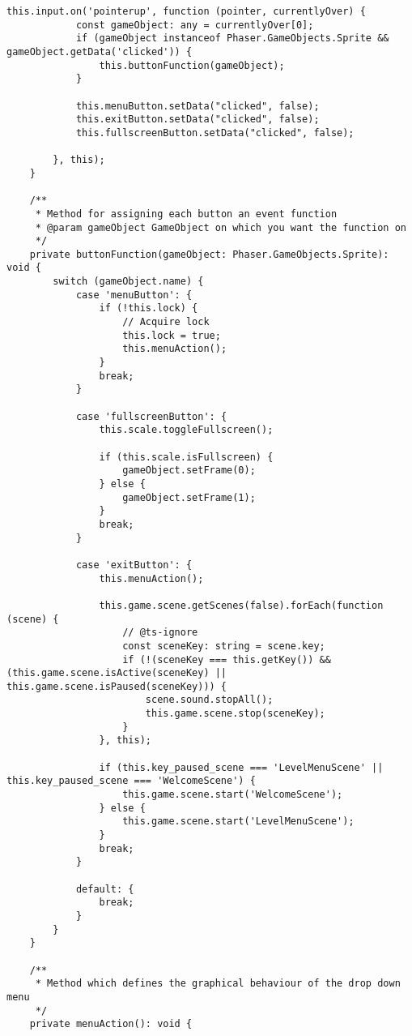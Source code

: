 \begin{lstlisting}[style=TypeScript, caption={dropDownMenu.ts}]
        this.input.on('pointerup', function (pointer, currentlyOver) {
            const gameObject: any = currentlyOver[0];
            if (gameObject instanceof Phaser.GameObjects.Sprite && gameObject.getData('clicked')) {
                this.buttonFunction(gameObject);
            }

            this.menuButton.setData("clicked", false);
            this.exitButton.setData("clicked", false);
            this.fullscreenButton.setData("clicked", false);

        }, this);
    }

    /**
     * Method for assigning each button an event function
     * @param gameObject GameObject on which you want the function on
     */
    private buttonFunction(gameObject: Phaser.GameObjects.Sprite): void {
        switch (gameObject.name) {
            case 'menuButton': {
                if (!this.lock) {
                    // Acquire lock
                    this.lock = true;
                    this.menuAction();
                }
                break;
            }

            case 'fullscreenButton': {
                this.scale.toggleFullscreen();

                if (this.scale.isFullscreen) {
                    gameObject.setFrame(0);
                } else {
                    gameObject.setFrame(1);
                }
                break;
            }

            case 'exitButton': {
                this.menuAction();

                this.game.scene.getScenes(false).forEach(function (scene) {
                    // @ts-ignore
                    const sceneKey: string = scene.key;
                    if (!(sceneKey === this.getKey()) && (this.game.scene.isActive(sceneKey) || this.game.scene.isPaused(sceneKey))) {
                        scene.sound.stopAll();
                        this.game.scene.stop(sceneKey);
                    }
                }, this);

                if (this.key_paused_scene === 'LevelMenuScene' || this.key_paused_scene === 'WelcomeScene') {
                    this.game.scene.start('WelcomeScene');
                } else {
                    this.game.scene.start('LevelMenuScene');
                }
                break;
            }

            default: {
                break;
            }
        }
    }

    /**
     * Method which defines the graphical behaviour of the drop down menu
     */
    private menuAction(): void {


\end{lstlisting}
